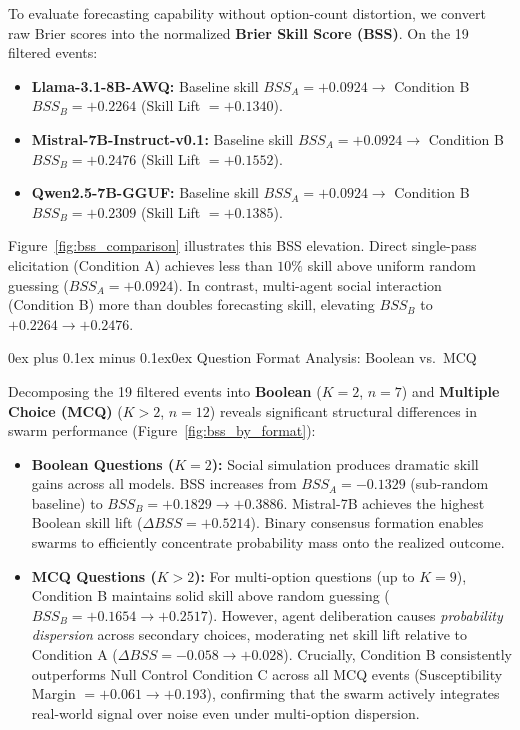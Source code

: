 \documentclass[11pt,journal,onecolumn]{IEEEtran}
\makeatletter
\renewcommand\subsubsection{\@startsection{subsubsection}{3}{\parindent}%
  {0ex plus 0.1ex minus 0.1ex}{0ex}%
  {\normalfont\normalsize\bfseries\itshape}}
\makeatother
\begin{document}
To evaluate forecasting capability without option-count distortion, we convert raw Brier scores into the normalized \textbf{Brier Skill Score (BSS)}. On the 19 filtered events:
\begin{itemize}
    \item \textbf{Llama-3.1-8B-AWQ:} Baseline skill $BSS_A = +0.0924 \to$ Condition B $BSS_B = \mathbf{+0.2264}$ (Skill Lift $= \mathbf{+0.1340}$).
    \item \textbf{Mistral-7B-Instruct-v0.1:} Baseline skill $BSS_A = +0.0924 \to$ Condition B $BSS_B = \mathbf{+0.2476}$ (Skill Lift $= \mathbf{+0.1552}$).
    \item \textbf{Qwen2.5-7B-GGUF:} Baseline skill $BSS_A = +0.0924 \to$ Condition B $BSS_B = \mathbf{+0.2309}$ (Skill Lift $= \mathbf{+0.1385}$).
\end{itemize}

Figure~\ref{fig:bss_comparison} illustrates this BSS elevation. Direct single-pass elicitation (Condition A) achieves less than $10\%$ skill above uniform random guessing ($BSS_A = +0.0924$). In contrast, multi-agent social interaction (Condition B) more than doubles forecasting skill, elevating $BSS_B$ to $+0.2264 \to +0.2476$.

\subsubsection{Question Format Analysis: Boolean vs.\ MCQ}

Decomposing the 19 filtered events into \textbf{Boolean} ($K=2$, $n=7$) and \textbf{Multiple Choice (MCQ)} ($K > 2$, $n=12$) reveals significant structural differences in swarm performance (Figure~\ref{fig:bss_by_format}):

\begin{itemize}
    \item \textbf{Boolean Questions ($K=2$):} Social simulation produces dramatic skill gains across all models. BSS increases from $BSS_A = -0.1329$ (sub-random baseline) to $BSS_B = +0.1829 \to +0.3886$. Mistral-7B achieves the highest Boolean skill lift ($\Delta BSS = +0.5214$). Binary consensus formation enables swarms to efficiently concentrate probability mass onto the realized outcome.
    \item \textbf{MCQ Questions ($K > 2$):} For multi-option questions (up to $K=9$), Condition B maintains solid skill above random guessing ($BSS_B = +0.1654 \to +0.2517$). However, agent deliberation causes \emph{probability dispersion} across secondary choices, moderating net skill lift relative to Condition A ($\Delta BSS = -0.058 \to +0.028$). Crucially, Condition B consistently outperforms Null Control Condition C across all MCQ events (Susceptibility Margin $= +0.061 \to +0.193$), confirming that the swarm actively integrates real-world signal over noise even under multi-option dispersion.
\end{itemize}
\end{document}
